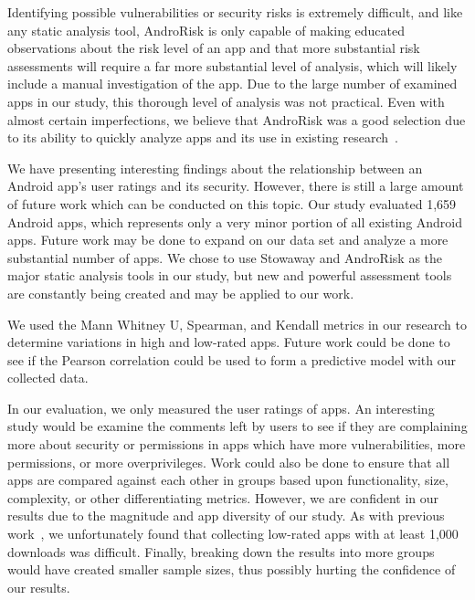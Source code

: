 \documentclass{sig-alternate}
\begin{document}
Identifying possible vulnerabilities or security risks is extremely difficult, and like any static analysis tool, AndroRisk is only capable of making educated observations about the risk level of an app and that more substantial risk assessments will require a far more substantial level of analysis, which will likely include a manual investigation of the app. Due to the large number of examined apps in our study, this thorough level of analysis was not practical. Even with almost certain imperfections, we believe that AndroRisk was a good selection due to its ability to quickly analyze apps and its use in existing research~\cite{krutz2015dataset}.



We have presenting interesting findings about the relationship between an Android app's user ratings and its security. However, there is still a large amount of future work which can be conducted on this topic. Our study evaluated 1,659 Android apps, which represents only a very minor portion of all existing Android apps. Future work may be done to expand on our data set and analyze a more substantial number of apps. We chose to use Stowaway and AndroRisk as the major static analysis tools in our study, but new and powerful assessment tools are constantly being created and may be applied to our work.

We used the Mann Whitney U, Spearman, and Kendall metrics in our research to determine variations in high and low-rated apps. Future work could be done to see if the Pearson correlation could be used to form a predictive model with our collected data.

In our evaluation, we only measured the user ratings of apps. An interesting study would be examine the comments left by users to see if they are complaining more about security or permissions in apps which have more vulnerabilities, more permissions, or more overprivileges. Work could also be done to ensure that all apps are compared against each other in groups based upon functionality, size, complexity, or other differentiating metrics. However, we are confident in our results due to the magnitude and app diversity of our study. As with previous work~\cite{mojica2013large}, we unfortunately found that collecting low-rated apps with at least 1,000 downloads was difficult. Finally, breaking down the results into more groups would have created smaller sample sizes, thus possibly hurting the confidence of our results.
\end{document}
